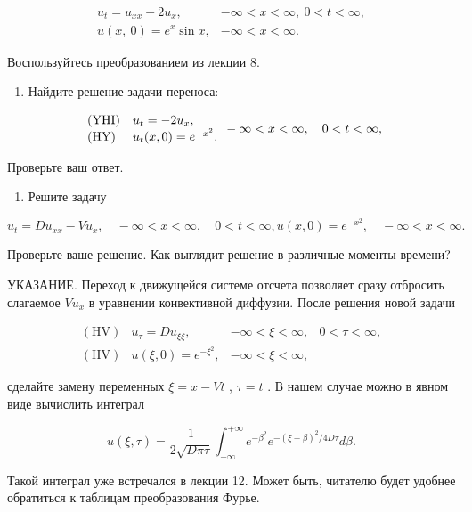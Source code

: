 \documentclass[
  ukrainian,
]{article}
\providecommand{\tightlist}{%
  \setlength{\itemsep}{0pt}\setlength{\parskip}{0pt}}
\begin{document}
\[
\begin{array}{ll} u_t = u_{xx} - 2u_x, & -\infty < x < \infty, \ 0 < t < \infty, \\ u(x, \ 0) = e^x \sin x, & -\infty < x < \infty. \end{array}
\]

Воспользуйтесь преобразованием из лекции 8.

\begin{enumerate}
\def\labelenumi{\arabic{enumi}.}
\setcounter{enumi}{2}
\tightlist
\item
  Найдите решение задачи переноса:
\end{enumerate}

\[
\begin{array}{ll} (\text{YHI}) & u_t = -2u_x, \\ (\text{HY}) & u_t(x, 0) = e^{-x^2}. \end{array} \\ -\infty < x < \infty, \quad 0 < t < \infty,
\]

Проверьте ваш ответ.

\begin{enumerate}
\def\labelenumi{\arabic{enumi}.}
\setcounter{enumi}{3}
\tightlist
\item
  Решите задачу
\end{enumerate}

\[
u_t = Du_{xx} - Vu_x, \quad -\infty < x < \infty, \quad 0 < t < \infty,
u(x, 0) = e^{-x^2}, \quad -\infty < x < \infty.
\]

Проверьте ваше решение. Как выглядит решение в различные моменты
времени?

УКАЗАНИЕ. Переход к движущейся системе отсчета позволяет сразу отбросить
слагаемое \(Vu_x\) в уравнении конвективной диффузии. После решения
новой задачи

\[
\begin{array}{ll} (\text{HV}) & u_{\tau} = Du_{\xi\xi}, & -\infty < \xi < \infty, & 0 < \tau < \infty, \\ (\text{HV}) & u(\xi, 0) = e^{-\xi^2}, & -\infty < \xi < \infty, \end{array}
\]

сделайте замену переменных \(\xi = x - Vt\) , \(\tau = t\) . В нашем
случае можно в явном виде вычислить интеграл

\[
u(\xi, \tau) = \frac{1}{2\sqrt{D\pi\tau}} \int_{-\infty}^{+\infty} e^{-\beta^2} e^{-(\xi-\beta)^2/4D\tau} d\beta.
\]

Такой интеграл уже встречался в лекции 12. Может быть, читателю будет
удобнее обратиться к таблицам преобразования Фурье.
\end{document}
